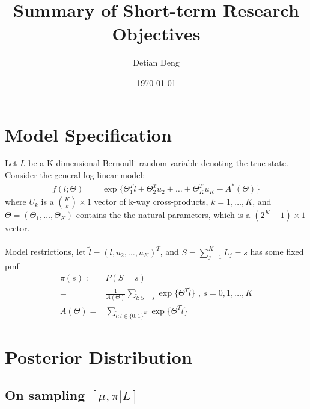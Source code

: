 \documentclass[11 pt, a4paper]{article}  %
\begin{document}
\title{Summary of Short-term Research Objectives}   %
\author{Detian Deng}         %
\date{\today}    %
\maketitle


\section{Model Specification}             %
Let $L$ be a K-dimensional Bernoulli random variable denoting the true state.
Consider the general log linear model:
\begin{align*}
f(l; \Theta) = & \exp \{\Theta_1^T l + \Theta_2^{T} u_2 + \ldots + \Theta_K^T u_K - A^*(\Theta)\}
\end{align*}
where $U_k$ is a ${K \choose k} \times 1$ vector of k-way cross-products, $k = 1,\ldots,K$,  and $\Theta = (\Theta_1,\ldots, \Theta_K)$ contains the the natural parameters, which is a $(2^K-1) \times 1$ vector.\\
\ \\
Model restrictions, let $\tilde{l} = (l,u_2,\dots,u_K)^T$, and $S = \sum_{j=1}^K L_j = s$ has some fixed pmf 
\begin{align}
\pi(s) := & P(S=s)\nonumber \\ 
= & \frac{1}{A(\Theta)} \sum_{\tilde{l}:S=s}\exp \{ \Theta^T \tilde{l}\}  \text{ , } s = 0,1,\ldots, K \\
A(\Theta) = & \sum_{\tilde{l}:l\in \{0,1\}^K}\exp \{ \Theta^T \tilde{l}\}
\end{align}


\newpage
\section{Posterior Distribution}

\subsection{On sampling $[\mu, \pi | L]$}
\end{document}
